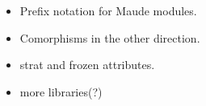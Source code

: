 
\begin{itemize}
\item Prefix notation for Maude modules.
\item Comorphisms in the other direction.
\item strat and frozen attributes.
\item more libraries(?)
\end{itemize}